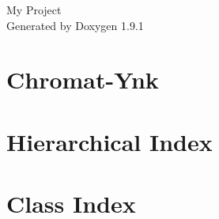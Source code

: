 \let\mypdfximage\pdfximage\def\pdfximage{\immediate\mypdfximage}\documentclass[twoside]{book}
\newcommand{\+}{\discretionary{\mbox{\scriptsize$\hookleftarrow$}}{}{}}
\newcommand{\clearemptydoublepage}{%
  \newpage{\pagestyle{empty}\cleardoublepage}%
}
\begin{document}
\raggedbottom

\hypersetup{pageanchor=false,
             bookmarksnumbered=true,
             pdfencoding=unicode
            }
\begin{titlepage}
\vspace*{7cm}
\begin{center}%
{\Large My Project }\\
\vspace*{1cm}
{\large Generated by Doxygen 1.9.1}\\
\end{center}
\end{titlepage}
\clearemptydoublepage
{}
\tableofcontents
\clearemptydoublepage
{}
\hypersetup{pageanchor=true}

\chapter{Chromat-\/\+Ynk}
\label{md_README}

\chapter{Hierarchical Index}

\chapter{Class Index}

\end{document}
